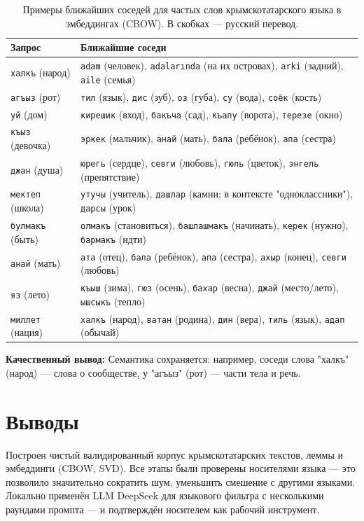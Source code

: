 \documentclass{article}
\begin{document}
\begin{table}[!tbh]
    \centering
    \begin{tabular}{|l|l|}
\hline
Запрос & Ближайшие соседи \\
\hline
\texttt{халкъ} (народ) & \texttt{adam} (человек), \texttt{adalarında} (на их островах), \texttt{arki} (задний), \texttt{aile} (семья) \\
\texttt{агъыз} (рот) & \texttt{тил} (язык), \texttt{дис} (зуб), \texttt{оз} (губа), \texttt{су} (вода), \texttt{соёк} (кость) \\
\texttt{уй} (дом) & \texttt{кирешик} (вход), \texttt{бакъча} (сад), \texttt{къапу} (ворота), \texttt{терезе} (окно) \\
\texttt{къыз} (девочка) & \texttt{эркек} (мальчик), \texttt{анай} (мать), \texttt{бала} (ребёнок), \texttt{апа} (сестра) \\
\texttt{джан} (душа) & \texttt{юрегь} (сердце), \texttt{севги} (любовь), \texttt{гюль} (цветок), \texttt{энгель} (препятствие) \\
\texttt{мектеп} (школа) & \texttt{утучы} (учитель), \texttt{дашлар} (камни; в контексте "одноклассники"), \texttt{дарсы} (урок) \\
\texttt{булмакъ} (быть) & \texttt{олмакъ} (становиться), \texttt{башлашмакъ} (начинать), \texttt{керек} (нужно), \texttt{бармакъ} (идти) \\
\texttt{анай} (мать) & \texttt{ата} (отец), \texttt{бала} (ребёнок), \texttt{апа} (сестра), \texttt{ахыр} (конец), \texttt{севги} (любовь) \\
\texttt{яз} (лето) & \texttt{къыш} (зима), \texttt{гюз} (осень), \texttt{бахар} (весна), \texttt{джай} (место/лето), \texttt{ышсыкъ} (тепло) \\
\texttt{миллет} (нация) & \texttt{халкъ} (народ), \texttt{ватан} (родина), \texttt{дин} (вера), \texttt{тиль} (язык), \texttt{адап} (обычай) \\
\hline
    \end{tabular}
    \caption{Примеры ближайших соседей для частых слов крымскотатарского языка в эмбеддингах (CBOW). В скобках — русский перевод.}
    \label{tab:neighbors}
\end{table}

\textbf{Качественный вывод:} Семантика сохраняется: например, соседи слова "халкъ" (народ) — слова о сообществе, у "агъыз" (рот) — части тела и речь.

\section{Выводы}
Построен чистый валидированный корпус крымскотатарских текстов, леммы и эмбеддинги (CBOW, SVD). Все этапы были проверены носителями языка — это позволило значительно сократить шум, уменьшить смешение с другими языками. Локально применён LLM DeepSeek для языкового фильтра с несколькими раундами промпта — и подтверждён носителем как рабочий инструмент.
\end{document}
